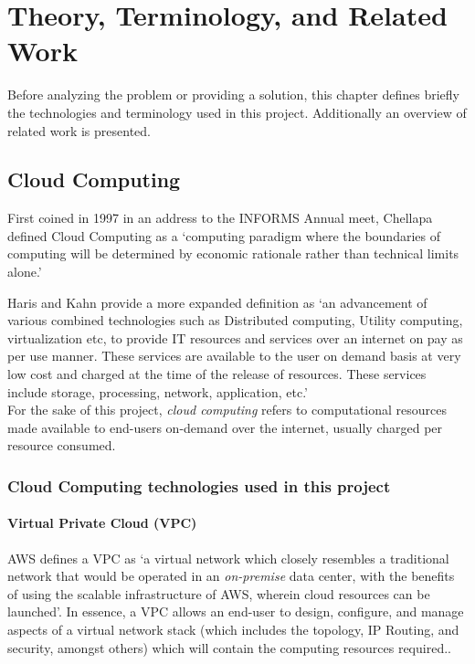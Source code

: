 \chapter{Theory, Terminology, and Related Work}
\label{sec:theory}
Before analyzing the problem or providing a solution,
this chapter defines briefly the technologies and terminology used in this project.
Additionally an overview of related work is presented.

\section{Cloud Computing}
First coined in 1997\cite{ray2018} in an address to the INFORMS Annual meet, 
Chellapa defined Cloud Computing as a `computing paradigm where the boundaries of computing will be determined by economic rationale rather than technical limits alone.'\cite{chellappa1997intermediaries}

Haris and Kahn provide a more expanded definition as `an advancement of various combined technologies such as 
Distributed computing, Utility computing, virtualization etc, to provide IT resources and services over an internet on pay as per use manner. 
These services are available to the user on demand basis at very low cost and charged at the time of the release of resources. 
These services include storage, processing, network, application, etc.'\cite{haris2018systematic} \\

\noindent For the sake of this project, \emph{cloud computing} refers to computational resources made available to end-users on-demand over the internet, 
usually charged per resource consumed.

\subsection{Cloud Computing technologies used in this project}

\subsubsection{Virtual Private Cloud (VPC)}
AWS defines a VPC as `a virtual network which closely resembles a traditional network that would be operated in an \emph{on-premise} data center, 
with the benefits of using the scalable infrastructure of AWS, wherein cloud resources can be launched'\cite{awsdocs_2022}.
In essence, a VPC allows an end-user to design, configure, and manage aspects of a virtual network stack (which includes the topology, IP Routing, and security, amongst others) 
which will contain the computing resources required.\cite{Beach2019}.

